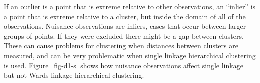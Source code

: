\documentclass[
  letterpaper,
]{krantz}
\newenvironment{Shaded}{\begin{snugshade}}{\end{snugshade}}
\newcommand{\AttributeTok}[1]{\textcolor[rgb]{0.40,0.45,0.13}{#1}}
\newcommand{\CommentTok}[1]{\textcolor[rgb]{0.37,0.37,0.37}{#1}}
\newcommand{\ConstantTok}[1]{\textcolor[rgb]{0.56,0.35,0.01}{#1}}
\newcommand{\DecValTok}[1]{\textcolor[rgb]{0.68,0.00,0.00}{#1}}
\newcommand{\FloatTok}[1]{\textcolor[rgb]{0.68,0.00,0.00}{#1}}
\newcommand{\FunctionTok}[1]{\textcolor[rgb]{0.28,0.35,0.67}{#1}}
\newcommand{\NormalTok}[1]{\textcolor[rgb]{0.00,0.23,0.31}{#1}}
\newcommand{\OtherTok}[1]{\textcolor[rgb]{0.00,0.23,0.31}{#1}}
\newcommand{\SpecialCharTok}[1]{\textcolor[rgb]{0.37,0.37,0.37}{#1}}
\newcommand{\StringTok}[1]{\textcolor[rgb]{0.13,0.47,0.30}{#1}}
\begin{document}
If an outlier is a point that is extreme relative to other observations,
an ``inlier'' is a point that is extreme relative to a cluster, but
inside the domain of all of the observations. Nuisance observations are
inliers, cases that occur between larger groups of points. If they were
excluded there might be a gap between clusters. These can cause problems
for clustering when distances between clusters are measured, and can be
very problematic when single linkage hierarchical clustering is used.
Figure~\ref{fig-d1-s} shows how nuisance observations affect single
linkage but not Wards linkage hierarchical clustering.

\begin{Shaded}
\end{Shaded}
\end{document}
